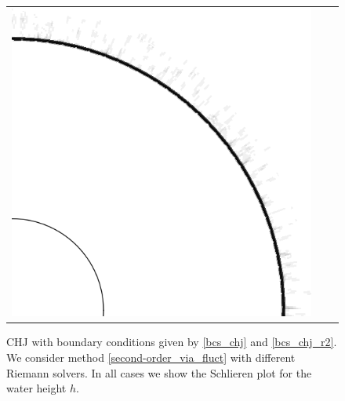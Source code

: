 \documentclass[preprint, 11pt]{article}
\begin{document}
\begin{figure}[!h]
{\begin{tabular}{ccc}
      \includegraphics[scale=0.3]{figures/chj_r2_blended_t0p1.png}
    \end{tabular}
    }
  \caption{CHJ with boundary conditions given by \eqref{bcs_chj} and \eqref{bcs_chj_r2}. 
    We consider method \eqref{second-order_via_fluct} with different Riemann solvers.
    In all cases we show the Schlieren plot for the water height $h$.
  }
\end{figure}
\end{document}
